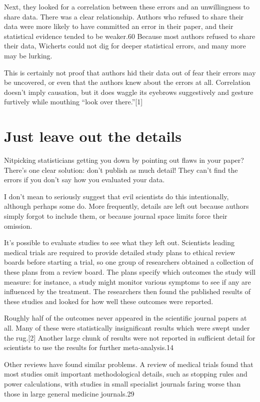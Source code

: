 Next, they looked for a correlation between these errors and an unwillingness to share data. There was a clear relationship. Authors who refused to share their data were more likely to have committed an error in their paper, and their statistical evidence tended to be weaker.60 Because most authors refused to share their data, Wicherts could not dig for deeper statistical errors, and many more may be lurking.

This is certainly not proof that authors hid their data out of fear their errors may be uncovered, or even that the authors knew about the errors at all. Correlation doesn’t imply causation, but it does waggle its eyebrows suggestively and gesture furtively while mouthing “look over there.”[1]


\section{Just leave out the details}
\label{chp10:leaveoutdetails}

Nitpicking statisticians getting you down by pointing out flaws in your paper? There’s one clear solution: don’t publish as much detail! They can’t find the errors if you don’t say how you evaluated your data.

I don’t mean to seriously suggest that evil scientists do this intentionally, although perhaps some do. More frequently, details are left out because authors simply forgot to include them, or because journal space limits force their omission.

It’s possible to evaluate studies to see what they left out. Scientists leading medical trials are required to provide detailed study plans to ethical review boards before starting a trial, so one group of researchers obtained a collection of these plans from a review board. The plans specify which outcomes the study will measure: for instance, a study might monitor various symptoms to see if any are influenced by the treatment. The researchers then found the published results of these studies and looked for how well these outcomes were reported.

Roughly half of the outcomes never appeared in the scientific journal papers at all. Many of these were statistically insignificant results which were swept under the rug.[2] Another large chunk of results were not reported in sufficient detail for scientists to use the results for further meta-analysis.14

Other reviews have found similar problems. A review of medical trials found that most studies omit important methodological details, such as stopping rules and power calculations, with studies in small specialist journals faring worse than those in large general medicine journals.29

